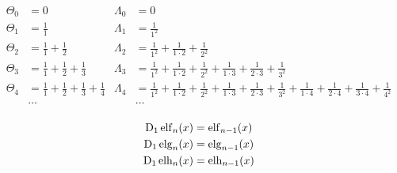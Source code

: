 \begin{equation*} \begin{aligned}
\Theta_0 &= 0 &
\Lambda_0 &= 0 \\
%
\Theta_1 &= 
  \frac{1}{1} &
\Lambda_1 &= 
  \frac{1}{1^2} \\
%
\Theta_2 &= 
  \frac{1}{1} 
+ \frac{1}{2} &
\Lambda_2 &= 
  \frac{1}{1^2} 
+ \frac{1}{1 \cdot 2} 
+ \frac{1}{2^2} \\
%
\Theta_3 &= 
  \frac{1}{1} 
+ \frac{1}{2} 
+ \frac{1}{3} &
\Lambda_3 &= 
  \frac{1}{1^2} 
+ \frac{1}{1 \cdot 2} 
+ \frac{1}{2^2}
+ \frac{1}{1 \cdot 3}
+ \frac{1}{2 \cdot 3}
+ \frac{1}{3^2} \\
%
\Theta_4 &= 
  \frac{1}{1} 
+ \frac{1}{2} 
+ \frac{1}{3} 
+ \frac{1}{4} &
\Lambda_4 &= 
  \frac{1}{1^2} 
+ \frac{1}{1 \cdot 2} 
+ \frac{1}{2^2}
+ \frac{1}{1 \cdot 3}
+ \frac{1}{2 \cdot 3}
+ \frac{1}{3^2}
+ \frac{1}{1 \cdot 4}
+ \frac{1}{2 \cdot 4}
+ \frac{1}{3 \cdot 4}
+ \frac{1}{4^2} \\
%
&\ldots & &\ldots \\
\end{aligned} \end{equation*}

\begin{equation*} \begin{aligned}
\mathrm{D}_1 \operatorname{elf}_n(x) &= \operatorname{elf}_{n - 1}(x) \\
\mathrm{D}_1 \operatorname{elg}_n(x) &= \operatorname{elg}_{n - 1}(x) \\
\mathrm{D}_1 \operatorname{elh}_n(x) &= \operatorname{elh}_{n - 1}(x) \\
\end{aligned} \end{equation*}

